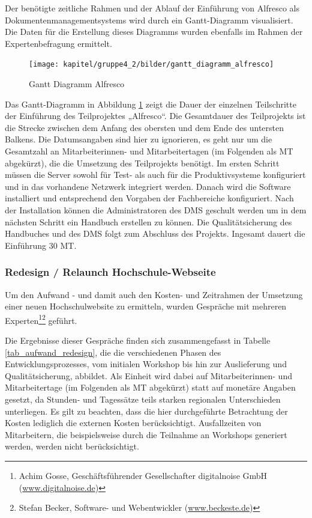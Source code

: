 Der benötigte zeitliche Rahmen und der Ablauf der Einführung von Alfresco als Dokumentenmanagementsystems wird durch ein Gantt-Diagramm visualisiert. Die Daten für die Erstellung dieses Diagramms wurden ebenfalls im Rahmen der Expertenbefragung ermittelt.

\begin{figure}[h!]
	\centering
	\texttt{[image: kapitel/gruppe4\_2/bilder/gantt\_diagramm\_alfresco]}
	\caption{Gantt Diagramm Alfresco}
	\label{fig_gantt_diagramm_alfresco}
\end{figure}

Das Gantt-Diagramm in Abbildung \ref{fig_gantt_diagramm_alfresco} zeigt die Dauer der einzelnen Teilschritte der Einführung des Teilprojektes „Alfresco“. Die Gesamtdauer des Teilprojekts ist die Strecke zwischen dem Anfang des obersten und dem Ende des untersten Balkens. Die Datumsangaben sind hier zu ignorieren, es geht nur um die Gesamtzahl an Mitarbeiterinnen- und Mitarbeitertagen (im Folgenden als MT abgekürzt), die die Umsetzung des Teilprojekts benötigt. Im ersten Schritt müssen die Server sowohl für Test- als auch für die Produktivsysteme konfiguriert und in das vorhandene Netzwerk integriert werden. Danach wird die Software installiert und entsprechend den Vorgaben der Fachbereiche konfiguriert. Nach der Installation können die Administratoren des DMS geschult werden um in dem nächsten Schritt ein Handbuch erstellen zu können. Die Qualitätsicherung des Handbuches und des DMS folgt zum Abschluss des Projekts. Ingesamt dauert die Einführung 30 MT.

\subsubsection{Redesign / Relaunch Hochschule-Webseite}
\label{subsubsection_redesign_webseite}
Um den Aufwand - und damit auch den Kosten- und Zeitrahmen der Umsetzung einer neuen Hochschulwebsite zu ermitteln, wurden Gespräche mit mehreren Experten\footnote{Achim Gosse, Geschäftsführender Gesellschafter digitalnoise GmbH (\url{www.digitalnoise.de})}\footnote{Stefan Becker, Software- und Webentwickler (\url{www.beckeste.de})} geführt.

Die Ergebnisse dieser Gespräche finden sich zusammengefasst in Tabelle \ref{tab_aufwand_redesign}, die die verschiedenen Phasen des Entwicklungsprozesses, vom initialen Workshop bis hin zur Auslieferung und Qualitätsicherung, abbildet. Als Einheit wird dabei auf Mitarbeiterinnen- und Mitarbeitertage (im Folgenden als MT abgekürzt) statt auf monetäre Angaben gesetzt, da Stunden- und Tagessätze teils starken regionalen Unterschieden unterliegen. Es gilt zu beachten, dass die hier durchgeführte Betrachtung der Kosten lediglich die externen Kosten berücksichtigt. Ausfallzeiten von Mitarbeitern, die beispielsweise durch die Teilnahme an Workshops generiert werden, werden nicht berücksichtigt.


